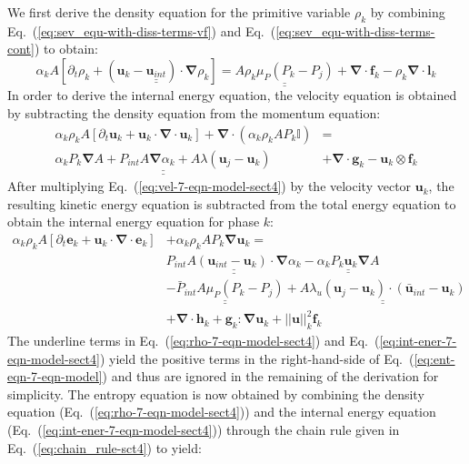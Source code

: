 \documentclass[preprint,10pt]{elsarticle}
\renewcommand{\div}{\mbold{\nabla}\! \cdot \!}
\newcommand{\grad}{\mbold{\nabla}}
\newcommand{\mbold}[1]{\boldsymbol#1}
\newcommand{\eqt}[1]{Eq.~(\ref{#1})}                     %
\begin{document}
%
We first derive the density equation for the primitive variable $\rho_k$ by combining \eqt{eq:sev_equ-with-diss-terms-vf} and \eqt{eq:sev_equ-with-diss-terms-cont} to obtain:
%
\begin{equation}\label{eq:rho-7-eqn-model-sect4}
\alpha_k A \left[ \partial_t \rho_k + \left( \mbold u_k - \underline{\underline{\mbold u_{int}}} \right) \cdot \grad \rho_k \right] = \underline{\underline{A \rho_k \mu_P \left( P_k - P_j \right)}} + \div \mbold f_k - \rho_k \div \mbold l_k
\end{equation}
%
In order to derive the internal energy equation, the velocity equation is obtained by subtracting the density equation from the momentum equation:
%
\begin{align}\label{eq:vel-7-eqn-model-sect4}
\alpha_k \rho_k  A \left[ \partial_t \mbold u_k + \mbold u_k \cdot \div \mbold u_k \right]  + \div \left( \alpha_k \rho_k A P_k \mathbb{I} \right) &=\nonumber\\
\underline{\underline{\alpha_k P_k \grad A + P_{int} A \grad \alpha_k + A \lambda \left( \mbold u_j - \mbold u_k \right)}} &+ \div \mbold g_k - \mbold u_k \otimes \mbold f_k
\end{align}
%
After multiplying \eqt{eq:vel-7-eqn-model-sect4} by the velocity vector $\mbold u_k$, the resulting kinetic energy equation is subtracted from the total energy equation to obtain the internal energy equation for phase $k$:
%
\begin{align}\label{eq:int-ener-7-eqn-model-sect4}
\alpha_k \rho_k  A \left[ \partial_t \mbold e_k + \mbold u_k \cdot \div \mbold e_k \right]  &+ \alpha_k \rho_k A P_k \grad \mbold u_k =\nonumber\\
&\underline{\underline{P_{int} A \left(\mbold u_{int}-\mbold u_k \right) \cdot \grad \alpha_k}} -  \underline{\underline{\alpha_k P_k \mbold u_k \grad A}} \nonumber \\ 
&\underline{\underline{-\bar{P}_{int} A \mu_P \left(P_k-P_j \right)}} + \underline{\underline{A \lambda_u \left(\mbold u_j-\mbold u_k  \right) \cdot \left(\bar{\mbold u}_{int}- \mbold u_k \right)}}\nonumber \\
&+ \div \mbold h_k + \mbold g_k : \grad \mbold u_k + || \mbold u ||^2_k \mbold f_k
\end{align}
%
The underline terms in \eqt{eq:rho-7-eqn-model-sect4} and \eqt{eq:int-ener-7-eqn-model-sect4} yield the positive terms in the right-hand-side of \eqt{eq:ent-eqn-7-eqn-model} and thus are ignored in the remaining of the derivation for simplicity. The entropy equation is now obtained by combining the density equation (\eqt{eq:rho-7-eqn-model-sect4}) and the internal energy equation (\eqt{eq:int-ener-7-eqn-model-sect4}) through the chain rule given in \eqt{eq:chain_rule-sct4} to yield:
\end{document}

